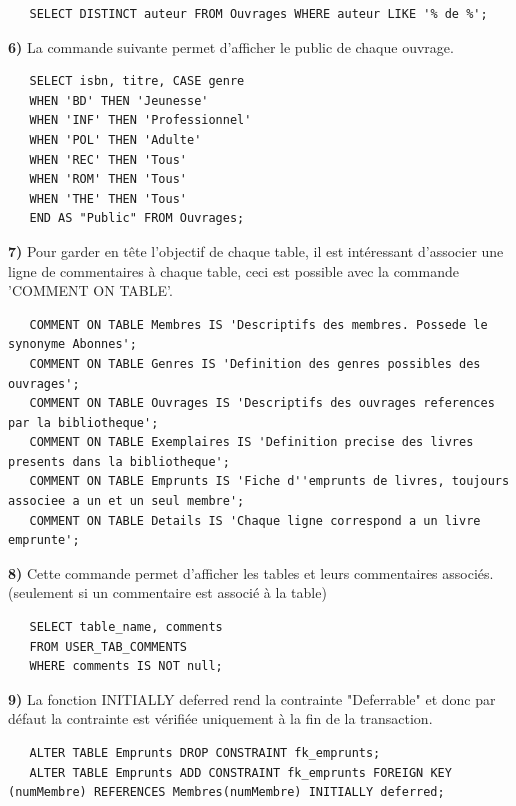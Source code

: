 \documentclass[a4paper,12pt]{article}
\begin{document}
    \begin{lstlisting}
   SELECT DISTINCT auteur FROM Ouvrages WHERE auteur LIKE '% de %';
   \end{lstlisting}
   \textbf {6)} La commande suivante permet d'afficher le public de chaque ouvrage.
   
   \begin{lstlisting}
   SELECT isbn, titre, CASE genre 
   WHEN 'BD' THEN 'Jeunesse' 
   WHEN 'INF' THEN 'Professionnel' 
   WHEN 'POL' THEN 'Adulte' 
   WHEN 'REC' THEN 'Tous' 
   WHEN 'ROM' THEN 'Tous' 
   WHEN 'THE' THEN 'Tous' 
   END AS "Public" FROM Ouvrages;
   \end{lstlisting}
   
   
   \textbf {7)} Pour garder en tête l'objectif de chaque table, il est intéressant d'associer une ligne de commentaires à chaque table, ceci est possible avec la commande 'COMMENT ON TABLE'.
   
   \begin{lstlisting}
   COMMENT ON TABLE Membres IS 'Descriptifs des membres. Possede le synonyme Abonnes';
   COMMENT ON TABLE Genres IS 'Definition des genres possibles des ouvrages';
   COMMENT ON TABLE Ouvrages IS 'Descriptifs des ouvrages references par la bibliotheque';
   COMMENT ON TABLE Exemplaires IS 'Definition precise des livres presents dans la bibliotheque';
   COMMENT ON TABLE Emprunts IS 'Fiche d''emprunts de livres, toujours associee a un et un seul membre';
   COMMENT ON TABLE Details IS 'Chaque ligne correspond a un livre emprunte';
   \end{lstlisting}   
   
   \textbf {8)} Cette commande permet d'afficher les tables et leurs commentaires associés. (seulement si un commentaire est associé à la table)
   
   \begin{lstlisting}
   SELECT table_name, comments 
   FROM USER_TAB_COMMENTS 
   WHERE comments IS NOT null;
   \end{lstlisting} 

   \textbf {9)} La fonction INITIALLY deferred rend la contrainte "Deferrable" et donc par défaut la contrainte est vérifiée uniquement à la fin de la transaction.
   
   \begin{lstlisting}
   ALTER TABLE Emprunts DROP CONSTRAINT fk_emprunts;
   ALTER TABLE Emprunts ADD CONSTRAINT fk_emprunts FOREIGN KEY (numMembre) REFERENCES Membres(numMembre) INITIALLY deferred;
   \end{lstlisting}   
   
\end{document}
